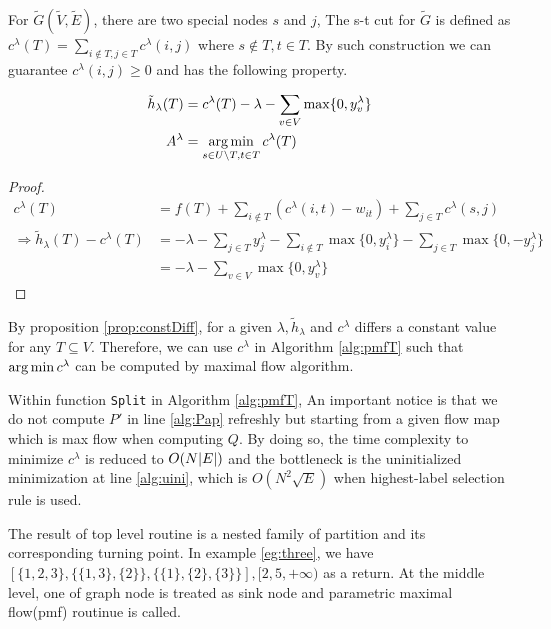\documentclass{article}
\begin{document}
For $\widetilde{G}(\widetilde{V}, \widetilde{E})$, there are two special nodes $s$ and $j$, The s-t cut for $\widetilde{G}$
is defined as $c^{\lambda}(T) = \sum_{i \not\in T, j \in T} c^{\lambda}(i,j)$ where $s \not\in T, t \in T$. By such construction we can guarantee $c^{\lambda}(i,j)\geq 0$ and has the following property.
\begin{proposition}\label{prop:constDiff}
	\begin{align}
		\tilde{h}_{\lambda}(T) &= c^{\lambda}(T) - \lambda - \sum_{v \in V} \max\{0, y^{\lambda}_v\}\\
	A^{\lambda}	&= \operatorname*{arg\,min}_{s\in U\backslash T, t\in T}c^{\lambda}(T) \label{eq:pmqe}
	\end{align}
\end{proposition}
\begin{proof}
	
	\begin{align*}
	c^{\lambda}(T) &= f(T) + \sum_{i \not\in T} (c^{\lambda}(i, t) - w_{it})+ \sum_{j \in T} c^{\lambda}(s,j) \\
	\Rightarrow \tilde{h}_{\lambda}(T) - c^{\lambda}(T) &= -\lambda - \sum_{j \in T} y^{\lambda}_j - \sum_{i \not\in T} \max\{0, y^{\lambda}_i\} - \sum_{j \in T} \max\{0,-y^{\lambda}_j\}\\
	&= -\lambda - \sum_{v \in V} \max\{0, y^{\lambda}_v\}
	\end{align*}
\end{proof}

By proposition \ref{prop:constDiff}, for a given $\lambda, \tilde{h}_{\lambda}$ and $c^{\lambda}$ differs a constant value for any $T\subseteq V$. Therefore, we can use $c^{\lambda}$ in Algorithm \ref{alg:pmfT} such that $\operatorname*{arg\,min} c^{\lambda}$ can be computed by maximal flow algorithm. 

Within function \texttt{Split} in Algorithm \ref{alg:pmfT}, An important notice is that we do not compute $P'$ in line \ref{alg:Pap} refreshly but starting from a given flow map which is max flow when computing $Q$. By doing so, the time complexity to minimize $c^{\lambda}$ is reduced to $O(N\lvert E\rvert)$ and the bottleneck is the uninitialized minimization at line \ref{alg:uini}, which is $O(N^2\sqrt{E})$ when highest-label selection rule is used.

The result of top level routine is a nested family of partition and its corresponding turning point. In example \ref{eg:three}, we have $[\{1,2,3\},\{\{1,3\},\{2\}\},\{\{1\},\{2\},\{3\}\}],[2,5,+\infty) $ as a return. At the middle level, one of graph node is treated as sink node and parametric maximal flow(pmf) routinue is called.
\end{document}
